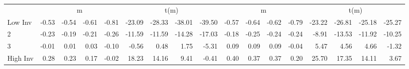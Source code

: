 \begin{table}[!ht]
\begin{tabular}{lrrrrrrrrrrrrrrrr}
  
    
      & \multicolumn{4}{c}{m} & \multicolumn{4}{c}{t(m)}
    
      & \multicolumn{4}{c}{m} & \multicolumn{4}{c}{t(m)}
    
    \\
      \cmidrule(r){2-5} \cmidrule(r){6-9} \cmidrule(r){10-13} \cmidrule(r){14-17}

    Low Inv   & -0.53  & -0.54  & -0.61  & -0.81  & -23.09  & -28.33  & -38.01  & -39.50  & -0.57  & -0.64  & -0.62  & -0.79  & -23.22  & -26.81  & -25.18  & -25.27  \\
           2  & -0.23  & -0.19  & -0.21  & -0.26  & -11.59  & -11.59  & -14.28  & -17.03  & -0.18  & -0.25  & -0.24  & -0.24  & -8.91  & -13.53  & -11.92  & -10.25  \\
           3  & -0.01  & 0.01  & 0.03  & -0.10  & -0.56  & 0.48  & 1.75  & -5.31  & 0.09  & 0.09  & 0.09  & -0.04  & 5.47  & 4.56  & 4.66  & -1.32  \\
    High Inv  & 0.28  & 0.23  & 0.17  & -0.02  & 18.23  & 14.16  & 9.41  & -0.41  & 0.40  & 0.37  & 0.37  & 0.20  & 25.70  & 17.35  & 14.11  & 3.67  \\

  

  \bottomrule
\end{tabular}
\label{tbl:32_Size_BM_Prior_C1997}
\end{table}